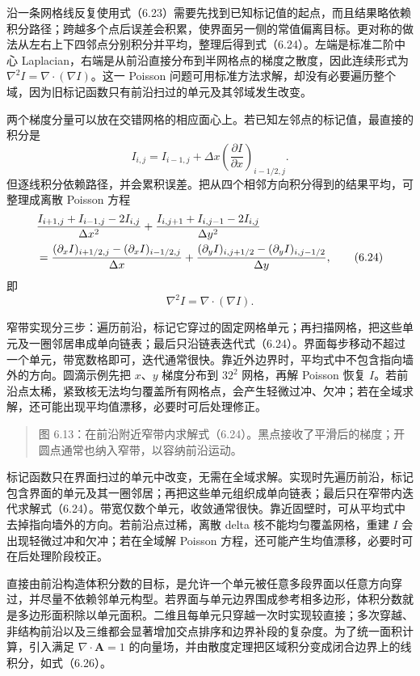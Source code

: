 \documentclass[11pt,a4paper,openany,fontset=none]{ctexbook}
\begin{document}
沿一条网格线反复使用式（6.23）需要先找到已知标记值的起点，而且结果略依赖积分路径；跨越多个点后误差会积累，使界面另一侧的常值偏离目标。更对称的做法从左右上下四邻点分别积分并平均，整理后得到式（6.24）。左端是标准二阶中心 Laplacian，右端是从前沿直接分布到半网格点的梯度之散度，因此连续形式为 $\nabla^2I=\nabla\cdot(\nabla I)$。这一 Poisson 问题可用标准方法求解，却没有必要遍历整个域，因为旧标记函数只有前沿扫过的单元及其邻域发生改变。

两个梯度分量可以放在交错网格的相应面心上。若已知左邻点的标记值，最直接的积分是
\begin{equation}
I_{i,j}=I_{i-1,j}+\Delta x
\left(\frac{\partial I}{\partial x}\right)_{i-1/2,j}.
\tag{6.23}
\end{equation}
但逐线积分依赖路径，并会累积误差。把从四个相邻方向积分得到的结果平均，可整理成离散 Poisson 方程
\begin{align}
&\frac{I_{i+1,j}+I_{i-1,j}-2I_{i,j}}{\Delta x^2}
+\frac{I_{i,j+1}+I_{i,j-1}-2I_{i,j}}{\Delta y^2}\notag\\
&=\frac{(\partial_x I)_{i+1/2,j}-(\partial_x I)_{i-1/2,j}}{\Delta x}
+\frac{(\partial_y I)_{i,j+1/2}-(\partial_y I)_{i,j-1/2}}{\Delta y},
\tag{6.24}
\end{align}
即
\begin{equation}
\nabla^2 I=\nabla\cdot(\nabla I).
\tag{6.25}
\end{equation}

窄带实现分三步：遍历前沿，标记它穿过的固定网格单元；再扫描网格，把这些单元及一圈邻居串成单向链表；最后只沿链表迭代式（6.24）。界面每步移动不超过一个单元，带宽数格即可，迭代通常很快。靠近外边界时，平均式中不包含指向墙外的方向。圆滴示例先把 $x$、$y$ 梯度分布到 $32^2$ 网格，再解 Poisson 恢复 $I$。若前沿点太稀，紧致核无法均匀覆盖所有网格点，会产生轻微过冲、欠冲；若在全域求解，还可能出现平均值漂移，必要时可后处理修正。

\begin{quote}\small 图 6.13：在前沿附近窄带内求解式（6.24）。黑点接收了平滑后的梯度；开圆点通常也纳入窄带，以容纳前沿运动。\end{quote}
标记函数只在界面扫过的单元中改变，无需在全域求解。实现时先遍历前沿，标记包含界面的单元及其一圈邻居；再把这些单元组织成单向链表；最后只在窄带内迭代求解式（6.24）。带宽仅数个单元，收敛通常很快。靠近固壁时，可从平均式中去掉指向墙外的方向。若前沿点过稀，离散 delta 核不能均匀覆盖网格，重建 $I$ 会出现轻微过冲和欠冲；若在全域解 Poisson 方程，还可能产生均值漂移，必要时可在后处理阶段校正。

直接由前沿构造体积分数的目标，是允许一个单元被任意多段界面以任意方向穿过，并尽量不依赖邻单元构型。若界面与单元边界围成参考相多边形，体积分数就是多边形面积除以单元面积。二维且每单元只穿越一次时实现较直接；多次穿越、非结构前沿以及三维都会显著增加交点排序和边界补段的复杂度。为了统一面积计算，引入满足 $\nabla\cdot\bm A=1$ 的向量场，并由散度定理把区域积分变成闭合边界上的线积分，如式（6.26）。
\end{document}
